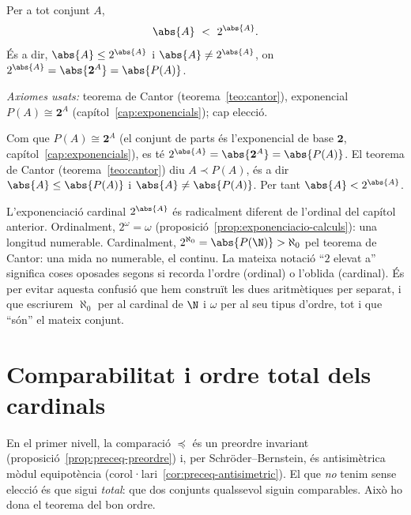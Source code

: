 \begin{teorema}\label{teo:cantor-cardinal}
Per a tot conjunt \(A\),
\[
\abs{A}\ <\ 2^{\abs{A}} .
\]
És a dir, \(\abs{A}\le 2^{\abs{A}}\) i \(\abs{A}\neq 2^{\abs{A}}\), on
\(2^{\abs{A}}=\abs{\mathbf2^{A}}=\abs{P(A)}\).\par
\emph{Axiomes usats:} teorema de Cantor (teorema~\ref{teo:cantor}), exponencial
\(P(A)\cong\mathbf2^{A}\) (capítol~\ref{cap:exponencials}); cap elecció.
\end{teorema}

\begin{prova}
Com que \(P(A)\cong\mathbf2^{A}\) (el conjunt de parts és l'exponencial de
base \(\mathbf2\), capítol~\ref{cap:exponencials}), es té
\(2^{\abs{A}}=\abs{\mathbf2^{A}}=\abs{P(A)}\). El teorema de Cantor
(teorema~\ref{teo:cantor}) diu \(A\prec P(A)\), és a dir
\(\abs{A}\le\abs{P(A)}\) i \(\abs{A}\neq\abs{P(A)}\). Per tant
\(\abs{A}<2^{\abs{A}}\).
\end{prova}

\begin{observacio}\label{obs:cardinal-vs-ordinal}
L'exponenciació cardinal \(2^{\abs{A}}\) és radicalment diferent de l'ordinal
del capítol anterior. Ordinalment, \(2^{\omega}=\omega\)
(proposició~\ref{prop:exponenciacio-calculs}): una longitud numerable.
Cardinalment, \(2^{\aleph_0}=\abs{P(\N)}>\aleph_0\) pel teorema de Cantor: una
mida no numerable, el continu. La mateixa notació \enquote{\(2\) elevat a}
significa coses oposades segons si recorda l'ordre (ordinal) o l'oblida
(cardinal). És per evitar aquesta confusió que hem construït les dues
aritmètiques per separat, i que escriurem \(\aleph_0\) per al cardinal de
\(\N\) i \(\omega\) per al seu tipus d'ordre, tot i que \enquote{són} el
mateix conjunt.
\end{observacio}

\section{Comparabilitat i ordre total dels cardinals}\label{sec:comparabilitat-cardinals}

En el primer nivell, la comparació \(\preceq\) és un preordre invariant
(proposició~\ref{prop:preceq-preordre}) i, per Schröder--Bernstein, és
antisimètrica mòdul equipotència (corol·lari~\ref{cor:preceq-antisimetric}).
El que \emph{no} tenim sense elecció és que sigui \emph{total}: que dos
conjunts qualssevol siguin comparables. Això ho dona el teorema del bon ordre.

